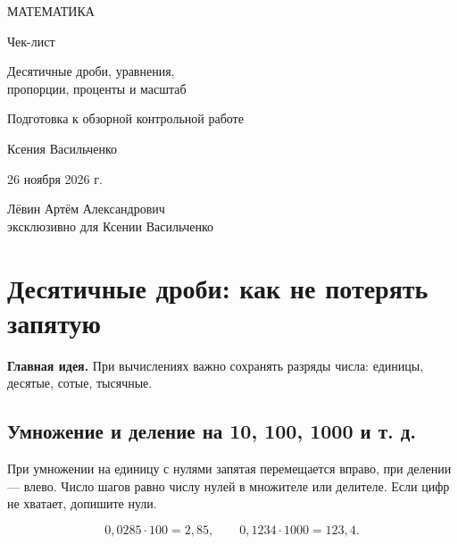 \documentclass[a4paper,12pt]{article}
\newcommand{\idea}[1]{\textcolor{darkaccent}{\textbf{#1}}}
\begin{document}
\begin{titlepage}
\centering
\vspace*{28mm}
{\Large\color{darkaccent} МАТЕМАТИКА\par}
\vspace{16mm}
{\Huge Чек-лист\par}
\vspace{9mm}
{\LARGE\color{accent} Десятичные дроби, уравнения,\\[2pt] пропорции, проценты и масштаб\par}
\vspace{15mm}
{\large Подготовка к обзорной контрольной работе\par}
\vfill
{\large Ксения Васильченко\par}
\vspace{9mm}
{26 ноября 2026 г.\par}
\vspace{15mm}
{\small Лёвин Артём Александрович\\эксклюзивно для Ксении Васильченко\par}
\vspace{18mm}
\vspace*{3mm}
\end{titlepage}
\setcounter{page}{1}
\section{Десятичные дроби: как не потерять запятую}
\idea{Главная идея.} При вычислениях важно сохранять разряды числа: единицы, десятые, сотые, тысячные.
\subsection{Умножение и деление на 10, 100, 1000 и т. д.}
При умножении на единицу с нулями запятая перемещается вправо, при делении --- влево. Число шагов равно числу нулей в множителе или делителе. Если цифр не хватает, допишите нули.
\begin{center}
\end{center}
\[
0{,}0285\cdot100=2{,}85,\qquad 0{,}1234\cdot1000=123{,}4.
\]
\end{document}
